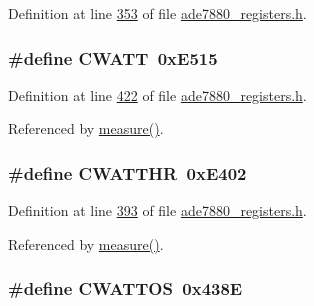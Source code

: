 Definition at line \hyperlink{a00036_source_l00353}{353} of file \hyperlink{a00036_source}{ade7880\-\_\-registers.\-h}.

\hypertarget{a00036_aeb58aae2f3e0c16a12cf4b6b03d6c5d9}{
\subsubsection[{C\-W\-A\-T\-T}]{\setlength{\rightskip}{0pt plus 5cm}\#define C\-W\-A\-T\-T~0x\-E515}}\label{de/d8c/a00036_aeb58aae2f3e0c16a12cf4b6b03d6c5d9}


Definition at line \hyperlink{a00036_source_l00422}{422} of file \hyperlink{a00036_source}{ade7880\-\_\-registers.\-h}.



Referenced by \hyperlink{a00042_source_l00040}{measure()}.

\hypertarget{a00036_ad685baf76950c0387bedffa9bb3272a9}{
\subsubsection[{C\-W\-A\-T\-T\-H\-R}]{\setlength{\rightskip}{0pt plus 5cm}\#define C\-W\-A\-T\-T\-H\-R~0x\-E402}}\label{de/d8c/a00036_ad685baf76950c0387bedffa9bb3272a9}


Definition at line \hyperlink{a00036_source_l00393}{393} of file \hyperlink{a00036_source}{ade7880\-\_\-registers.\-h}.



Referenced by \hyperlink{a00042_source_l00040}{measure()}.

\hypertarget{a00036_adefc91120b39bde4d31d7f685c834d1c}{
\subsubsection[{C\-W\-A\-T\-T\-O\-S}]{\setlength{\rightskip}{0pt plus 5cm}\#define C\-W\-A\-T\-T\-O\-S~0x438\-E}}\label{de/d8c/a00036_adefc91120b39bde4d31d7f685c834d1c}


